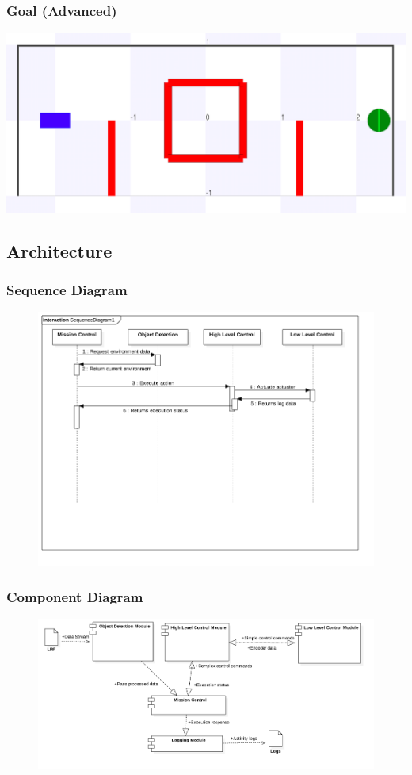 \documentclass{beamer}
\begin{document}
\begin{frame}
\frametitle{Goal (Advanced)}
\includegraphics[scale=0.28]{assets/images/Visualization.png}
\end{frame}

\subsection{Architecture}
\begin{frame}
\frametitle{Sequence Diagram}
\begin{figure}[H]
\centering
\includegraphics[scale=0.4]{assets/diagrams/SequenceDiagram.png}
\end{figure}
\end{frame}

\begin{frame}
\frametitle{Component Diagram}
\begin{figure}[H]
\centering
\includegraphics[scale=0.34]{assets/diagrams/ComponentDiagram.png}
\end{figure}
\end{frame}
\end{document}
